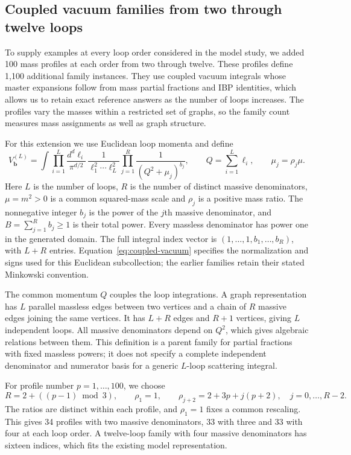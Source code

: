 \subsection{Coupled vacuum families from two through twelve loops}
\label{sec:higher-loop-generation}
To supply examples at every loop order considered in the model study,
we added 100 mass profiles at each order from two through twelve.
These profiles define 1,100 additional family instances. They use
coupled vacuum integrals whose master expansions follow from mass
partial fractions and IBP identities, which allows us to retain exact
reference answers as the number of loops increases. The profiles vary
the masses within a restricted set of graphs, so the family count
measures mass assignments as well as graph structure.

For this extension we use Euclidean loop momenta and define
\begin{equation}
 V^{(L)}_{\boldsymbol b}=
 \int\prod_{i=1}^{L}\frac{d^d\ell_i}{\pi^{d/2}}\,
 \frac{1}{\ell_1^2\cdots\ell_L^2}
 \prod_{j=1}^{R}\frac{1}{(Q^2+\mu_j)^{b_j}},
 \qquad
 Q=\sum_{i=1}^{L}\ell_i,\qquad \mu_j=\rho_j\mu .
 \label{eq:coupled-vacuum}
\end{equation}
Here $L$ is the number of loops, $R$ is the number of distinct massive
denominators, $\mu=m^2>0$ is a common squared-mass scale and
$\rho_j$ is a positive mass ratio. The nonnegative integer $b_j$
is the power of the $j$th massive denominator, and
$B=\sum_{j=1}^{R}b_j\geq1$ is their total power. Every massless
denominator has power one in the generated domain. The full integral
index vector is $(1,\ldots,1,b_1,\ldots,b_R)$, with $L+R$ entries.
Equation~\eqref{eq:coupled-vacuum} specifies the normalization and signs
used for this Euclidean subcollection; the earlier families retain
their stated Minkowski convention.

The common momentum $Q$ couples the loop integrations. A graph
representation has $L$ parallel massless edges between two vertices
and a chain of $R$ massive edges joining the same vertices. It has
$L+R$ edges and $R+1$ vertices, giving $L$ independent loops.
All massive denominators depend on $Q^2$, which gives algebraic
relations between them. This definition is a parent family for partial
fractions with fixed massless powers; it does not specify a complete
independent denominator and numerator basis for a generic
$L$-loop scattering integral.

For profile number $p=1,\ldots,100$, we choose
\begin{equation}
 R=2+((p-1)\bmod3),\qquad
 \rho_1=1,\qquad
 \rho_{j+2}=2+3p+j(p+2),\quad j=0,\ldots,R-2 .
 \label{eq:higher-loop-masses}
\end{equation}
The ratios are distinct within each profile, and $\rho_1=1$ fixes a
common rescaling. This gives 34 profiles with two massive
denominators, 33 with three and 33 with four at each loop order.
A twelve-loop family with four massive denominators has sixteen
indices, which fits the existing model representation.


